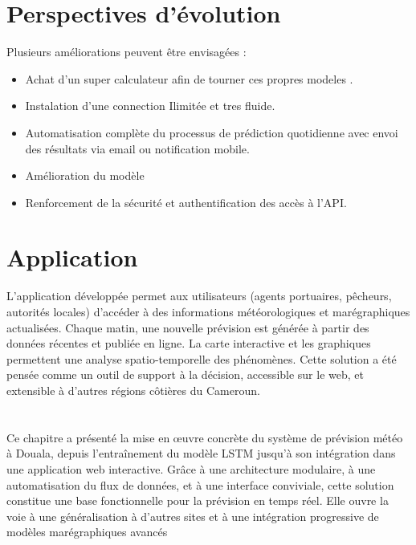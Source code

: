 \documentclass[a4paper,12pt,openany]{report}
\begin{document}
\section{Perspectives d’évolution}
Plusieurs améliorations peuvent être envisagées :
\begin{itemize}
	\item Achat d'un super calculateur afin de tourner ces propres modeles .
		\item Instalation d'une connection Ilimitée  et tres fluide.
	\item Automatisation complète du processus de prédiction quotidienne avec envoi des résultats via email ou notification mobile.\\
	\item Amélioration du modèle 
	\item  Renforcement de la sécurité et authentification des accès à l’API.
\end{itemize}

	\section{Application}
	L’application développée permet aux utilisateurs (agents portuaires, pêcheurs, autorités locales) d’accéder à des informations météorologiques et marégraphiques actualisées. Chaque matin, une nouvelle prévision est générée à partir des données récentes et publiée en ligne. La carte interactive et les graphiques permettent une analyse spatio-temporelle des phénomènes.
	Cette solution a été pensée comme un outil de support à la décision, accessible sur le web, et extensible à d’autres régions côtières du Cameroun.
	

\newpage
		\section*{}
	Ce chapitre a présenté la mise en œuvre concrète du système de prévision météo à Douala, depuis l’entraînement du modèle LSTM jusqu’à son intégration dans une application web interactive. Grâce à une architecture modulaire, à une automatisation du flux de données, et à une interface conviviale, cette solution constitue une base fonctionnelle pour la prévision en temps réel. Elle ouvre la voie à une généralisation à d’autres sites et à une intégration progressive de modèles marégraphiques avancés	


\end{document}
